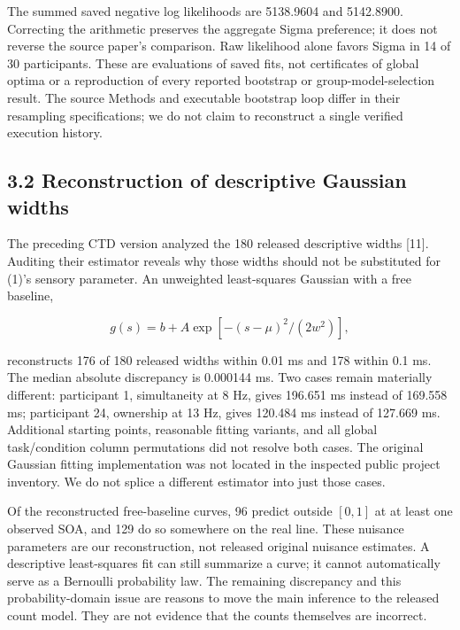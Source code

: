 \documentclass[
  11pt,
]{article}
\let\ctdoldsubsection\subsection
\renewcommand{\subsection}{\Needspace{6\baselineskip}\ctdoldsubsection}
\begin{document}
The summed saved negative log likelihoods are 5138.9604 and 5142.8900.
Correcting the arithmetic preserves the aggregate Sigma preference; it
does not reverse the source paper's comparison. Raw likelihood alone
favors Sigma in 14 of 30 participants. These are evaluations of saved
fits, not certificates of global optima or a reproduction of every
reported bootstrap or group-model-selection result. The source Methods
and executable bootstrap loop differ in their resampling specifications;
we do not claim to reconstruct a single verified execution history.

\hypertarget{reconstruction-of-descriptive-gaussian-widths}{%
\subsection{3.2 Reconstruction of descriptive Gaussian
widths}\label{reconstruction-of-descriptive-gaussian-widths}}

The preceding CTD version analyzed the 180 released descriptive widths
{[}11{]}. Auditing their estimator reveals why those widths should not
be substituted for (1)'s sensory parameter. An unweighted least-squares
Gaussian with a free baseline,

\[
g(s)=b+A\exp[-(s-\mu)^2/(2w^2)],
\tag{5}
\]

reconstructs 176 of 180 released widths within 0.01 ms and 178 within
0.1 ms. The median absolute discrepancy is 0.000144 ms. Two cases remain
materially different: participant 1, simultaneity at 8 Hz, gives 196.651
ms instead of 169.558 ms; participant 24, ownership at 13 Hz, gives
120.484 ms instead of 127.669 ms. Additional starting points, reasonable
fitting variants, and all global task/condition column permutations did
not resolve both cases. The original Gaussian fitting implementation was
not located in the inspected public project inventory. We do not splice
a different estimator into just those cases.

Of the reconstructed free-baseline curves, 96 predict outside \([0,1]\)
at at least one observed SOA, and 129 do so somewhere on the real line.
These nuisance parameters are our reconstruction, not released original
nuisance estimates. A descriptive least-squares fit can still summarize
a curve; it cannot automatically serve as a Bernoulli probability law.
The remaining discrepancy and this probability-domain issue are reasons
to move the main inference to the released count model. They are not
evidence that the counts themselves are incorrect.
\end{document}
